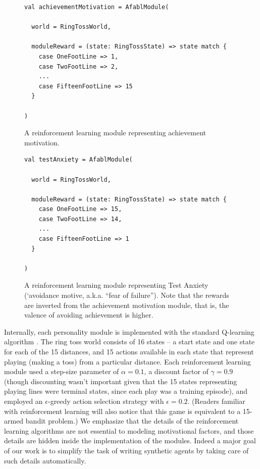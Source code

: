 \begin{figure}[h]
\begin{lstlisting}
val achievementMotivation = AfablModule(

  world = RingTossWorld,

  moduleReward = (state: RingTossState) => state match {
    case OneFootLine => 1,
    case TwoFootLine => 2,
    ...
    case FifteenFootLine => 15
  }

)
\end{lstlisting}
\caption{A reinforcement learning module representing achievement motivation.}
\label{fig:achievement}
\end{figure}

\begin{figure}[h]

\begin{lstlisting}
val testAnxiety = AfablModule(

  world = RingTossWorld,

  moduleReward = (state: RingTossState) => state match {
    case OneFootLine => 15,
    case TwoFootLine => 14,
    ...
    case FifteenFootLine => 1
  }

)
\end{lstlisting}

\caption{A reinforcement learning module representing Test Anxiety (`avoidance motive, a.k.a. ``fear of failure'').  Note that the rewards are inverted from the achievement motivation module, that is, the valence of avoiding achievement is higher.}
\label{fig:testanxiety}
\end{figure}

Internally, each personality module is implemented with the standard Q-learning algorithm \cite{sutton1998reinforcement}.  The ring toss world consists of 16 states -- a start state and one state for each of the 15 distances, and 15 actions available in each state that represent playing (making a toss) from a particular distance.  Each reinforcement learning module used a step-size parameter of $\alpha = 0.1$, a discount factor of $\gamma = 0.9$ (though discounting wasn't important given that the 15 states representing playing lines were terminal states, since each play was a training episode), and employed an $\epsilon$-greedy action selection strategy with $\epsilon = 0.2$.  (Readers familiar with reinforcement learning will also notice that this game is equivalent to a 15-armed bandit problem.)  We emphasize that the details of the reinforcement learning algorithms are not essential to modeling motivational factors, and those details are hidden inside the implementation of the modules.  Indeed a major goal of our work is to simplify the task of writing synthetic agents by taking care of such details automatically.

